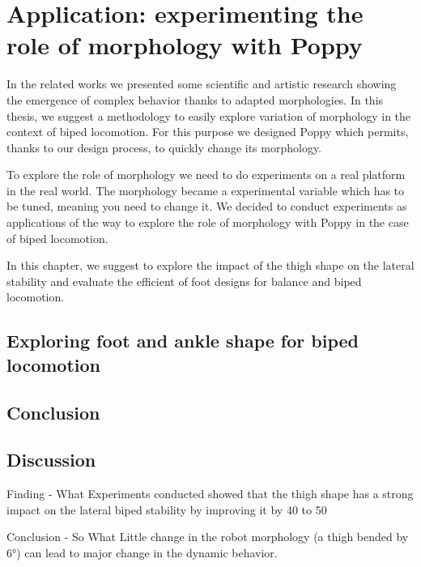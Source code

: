 
\chapter{Application: experimenting the role of morphology with Poppy} %
\label{cha:exploring_the_role_of_morphology}


In the related works we presented some scientific and artistic research showing the emergence of complex behavior thanks to adapted morphologies.
In this thesis, we suggest a methodology to easily explore variation of morphology in the context of biped locomotion.
For this purpose we designed Poppy which permits, thanks to our design process, to quickly change its morphology.

To explore the role of morphology we need to do experiments on a real platform in the real world.
The morphology became a experimental variable which has to be tuned, meaning you need to change it.
We decided to conduct experiments as applications of the way to explore the role of morphology with Poppy in the case of biped locomotion.

In this chapter,  we suggest to explore the impact of the thigh shape on the lateral stability and evaluate the efficient of foot designs for balance and biped locomotion.



\section{Exploring foot and ankle shape for biped locomotion} %
\label{sec:exploring_foot_and_ankle_shape_for_biped_locomotion}


\section{Conclusion} %
\label{sec:conclusion}


\section{Discussion} %
\label{sec:discussion}


Finding - What
Experiments conducted showed that the thigh shape has a strong impact on the lateral biped stability by improving it by 40 to 50%

Conclusion - So What
Little change in the robot morphology (a thigh bended by 6°) can lead to major change in the dynamic behavior.


